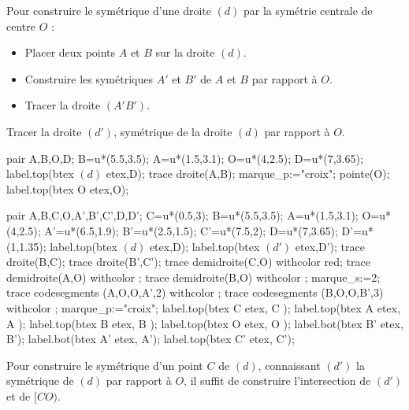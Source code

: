 \begin{methode*1}
    Pour construire le symétrique d'une droite $(d)$ par la symétrie centrale de centre $O$ :
    \begin{itemize}
        \item Placer deux points $A$ et $B$ sur la droite $(d)$.
        \item Construire les symétriques $A'$ et $B'$ de $A$ et $B$ par rapport à $O$.
        \item Tracer la droite $(A'B')$.
    \end{itemize}
    \exercice
    Tracer la droite $(d')$, symétrique de la droite $(d)$ par rapport à $O$. 
    
    \bigskip
    \begin{Geometrie}[CoinHD={(8u,4u)}]
        pair A,B,O,D;
        B=u*(5.5,3.5);
        A=u*(1.5,3.1);
        O=u*(4,2.5);
        D=u*(7,3.65);
        label.top(btex $(d)$ etex,D);
        trace droite(A,B);
        marque_p:="croix";
        pointe(O);
        label.top(btex O etex,O);
    \end{Geometrie}    
    \correction
    \phantom{rrr}

    \begin{Geometrie}[CoinHD={(8u,4u)}]
        pair A,B,C,O,A',B',C',D,D';
        C=u*(0.5,3);
        B=u*(5.5,3.5);
        A=u*(1.5,3.1);
        O=u*(4,2.5);
        A'=u*(6.5,1.9);
        B'=u*(2.5,1.5);
        C'=u*(7.5,2);
        D=u*(7,3.65);
        D'=u*(1,1.35);
        label.top(btex $(d)$ etex,D);
        label.top(btex $(d')$ etex,D');
        trace droite(B,C);
        trace droite(B',C');
        trace demidroite(C,O) withcolor red;
        trace demidroite(A,O) withcolor \myMetapostGreen;
        trace demidroite(B,O) withcolor \myMetapostGreen;
        marque_s:=2;
        trace codesegments (A,O,O,A',2) withcolor \myMetapostGreen;
        trace codesegments (B,O,O,B',3) withcolor \myMetapostGreen;
        marque_p:="croix";
        label.top(btex C  etex, C );
        label.top(btex A  etex, A );
        label.top(btex B  etex, B );
        label.top(btex O  etex, O );
        label.bot(btex B' etex, B');
        label.bot(btex A' etex, A');
        label.top(btex C' etex, C');
    \end{Geometrie}
\end{methode*1}

\begin{remarque}
    Pour construire le symétrique d'un point $C$ de $(d)$, connaissant $(d')$ la symétrique de $(d)$ par rapport à $O$, il suffit de construire l'intersection de $(d')$ et de $[CO)$.    
\end{remarque}

